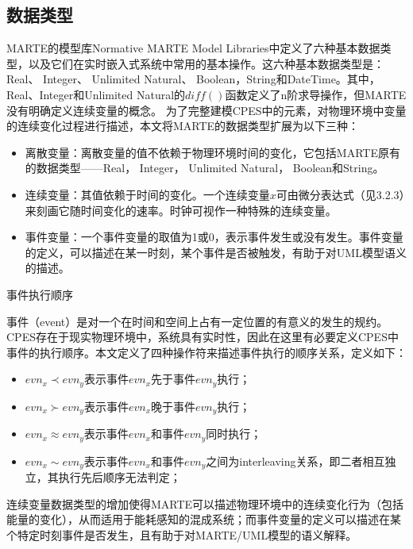 \subsection{数据类型}
	MARTE的模型库Normative MARTE Model Libraries中定义了六种基本数据类型，以及它们在实时嵌入式系统中常用的基本操作。这六种基本数据类型是：Real、 Integer、 Unlimited Natural、 Boolean，String和DateTime。其中，Real、Integer和Unlimited Natural的$diff()$函数定义了n阶求导操作，但MARTE没有明确定义连续变量的概念。
	为了完整建模CPES中的元素，对物理环境中变量的连续变化过程进行描述，本文将MARTE的数据类型扩展为以下三种：

	\begin{itemize}
	\item 离散变量：离散变量的值不依赖于物理环境时间的变化，它包括MARTE原有的数据类型——Real， Integer， Unlimited Natural， Boolean和String。
	\item 连续变量：其值依赖于时间的变化。一个连续变量$x$可由微分表达式（见3.2.3）来刻画它随时间变化的速率。时钟可视作一种特殊的连续变量。
	\item 事件变量：一个事件变量的取值为1或0，表示事件发生或没有发生。事件变量的定义，可以描述在某一时刻，某个事件是否被触发，有助于对UML模型语义的描述。
	\end{itemize}	
	
	\begin{myDef}事件执行顺序\end{myDef}	
	事件（event）是对一个在时间和空间上占有一定位置的有意义的发生的规约\citep{博什2001UML}。CPES存在于现实物理环境中，系统具有实时性，因此在这里有必要定义CPES中事件的执行顺序。本文定义了四种操作符来描述事件执行的顺序关系，定义如下：
	\begin{itemize}
	\item $evn_{x} \prec evn_{y}$表示事件$evn_{x}$先于事件$evn_{y}$执行；
	\item $evn_{x} \succ evn_{y}$表示事件$evn_{x}$晚于事件$evn_{y}$执行；
	\item $evn_{x} \approx evn_{y}$表示事件$evn_{x}$和事件$evn_{y}$同时执行；
	\item $evn_{x} \sim evn_{y}$表示事件$evn_{x}$和事件$evn_{y}$之间为interleaving\citep{Hoare1985Communicating}关系，即二者相互独立，其执行先后顺序无法判定；
	\end{itemize}
	
	连续变量数据类型的增加使得MARTE可以描述物理环境中的连续变化行为（包括能量的变化），从而适用于能耗感知的混成系统；而事件变量的定义可以描述在某个特定时刻事件是否发生，且有助于对MARTE/UML模型的语义解释。
	
